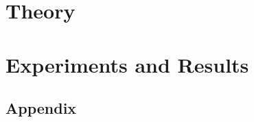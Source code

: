 \documentclass[a4paper, twoside]{report}
\begin{document}
\large








\tableofcontents
\newpage
\setcounter{page}{1}



\part{Theory}


\part{Experiments and Results}




\clearpage              %
\renewcommand{\bibname}{References}
\printbibliography

\clearpage              %
\myAppendix             %
\chapter*{Appendix}
{}


\end{document}
